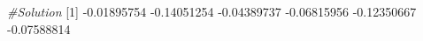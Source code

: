 \documentclass[
]{article}
\newenvironment{Shaded}{\begin{snugshade}}{\end{snugshade}}
\newcommand{\CommentTok}[1]{\textcolor[rgb]{0.56,0.35,0.01}{\textit{#1}}}
\newcommand{\DecValTok}[1]{\textcolor[rgb]{0.00,0.00,0.81}{#1}}
\newcommand{\FloatTok}[1]{\textcolor[rgb]{0.00,0.00,0.81}{#1}}
\newcommand{\NormalTok}[1]{#1}
\newcommand{\SpecialCharTok}[1]{\textcolor[rgb]{0.00,0.00,0.00}{#1}}
\begin{document}
\begin{Shaded}
\begin{Highlighting}[]
\CommentTok{\#Solution}
\NormalTok{[}\DecValTok{1}\NormalTok{] }\SpecialCharTok{{-}}\FloatTok{0.01895754} \SpecialCharTok{{-}}\FloatTok{0.14051254} \SpecialCharTok{{-}}\FloatTok{0.04389737} \SpecialCharTok{{-}}\FloatTok{0.06815956} \SpecialCharTok{{-}}\FloatTok{0.12350667} \SpecialCharTok{{-}}\FloatTok{0.07588814}
\end{Highlighting}
\end{Shaded}
\end{document}
